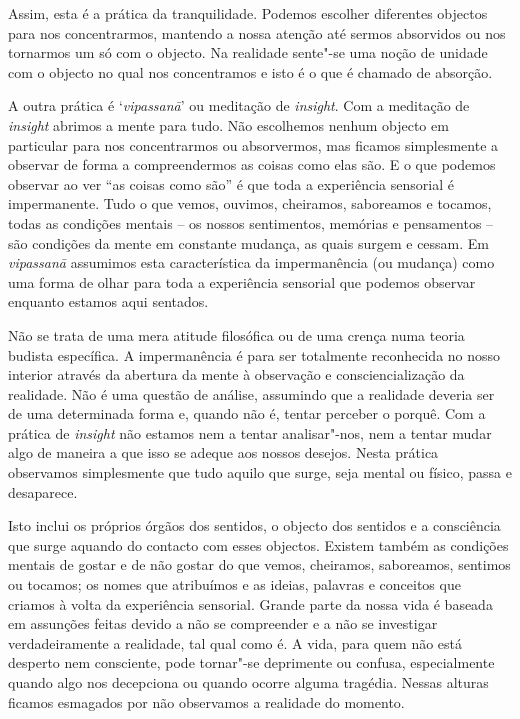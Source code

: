 Assim, esta é a prática da tranquilidade. Podemos escolher diferentes
objectos para nos concentrarmos, mantendo a nossa atenção até sermos
absorvidos ou nos tornarmos um só com o objecto. Na realidade sente"-se
uma noção de unidade com o objecto no qual nos concentramos e isto é o
que é chamado de absorção.

A outra prática é `\emph{vipassanā}' ou meditação de \emph{insight}. Com
a meditação de \emph{insight} abrimos a mente para tudo. Não escolhemos
nenhum objecto em particular para nos concentrarmos ou absorvermos, mas
ficamos simplesmente a observar de forma a compreendermos as coisas como
elas são. E o que podemos observar ao ver ``as coisas como são'' é que
toda a experiência sensorial é impermanente. Tudo o que vemos, ouvimos,
cheiramos, saboreamos e tocamos, todas as condições mentais -- os nossos
sentimentos, memórias e pensamentos -- são condições da mente em
constante mudança, as quais surgem e cessam. Em \emph{vipassanā}
assumimos esta característica da impermanência (ou mudança) como uma
forma de olhar para toda a experiência sensorial que podemos observar
enquanto estamos aqui sentados.

Não se trata de uma mera atitude filosófica ou de uma crença numa teoria
budista específica. A impermanência é para ser totalmente reconhecida no
nosso interior através da abertura da mente à observação e
consciencialização da realidade. Não é uma questão de análise, assumindo
que a realidade deveria ser de uma determinada forma e, quando não é,
tentar perceber o porquê. Com a prática de \emph{insight} não estamos
nem a tentar analisar"-nos, nem a tentar mudar algo de maneira a que isso
se adeque aos nossos desejos. Nesta prática observamos simplesmente que
tudo aquilo que surge, seja mental ou físico, passa e desaparece.

Isto inclui os próprios órgãos dos sentidos, o objecto dos sentidos e a
consciência que surge aquando do contacto com esses objectos. Existem
também as condições mentais de gostar e de não gostar do que vemos,
cheiramos, saboreamos, sentimos ou tocamos; os nomes que atribuímos e as
ideias, palavras e conceitos que criamos à volta da experiência
sensorial. Grande parte da nossa vida é baseada em assunções feitas
devido a não se compreender e a não se investigar verdadeiramente a
realidade, tal qual como é. A vida, para quem não está desperto nem
consciente, pode tornar"-se deprimente ou confusa, especialmente quando
algo nos decepciona ou quando ocorre alguma tragédia. Nessas alturas
ficamos esmagados por não observamos a realidade do momento.

